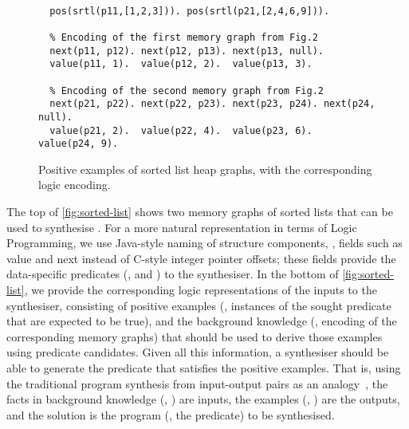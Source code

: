 \begin{figure}[t]
\centering

\\[5pt]
\begin{verbatim}
  pos(srtl(p11,[1,2,3])). pos(srtl(p21,[2,4,6,9])).

  % Encoding of the first memory graph from Fig.2
  next(p11, p12). next(p12, p13). next(p13, null). 
  value(p11, 1).  value(p12, 2).  value(p13, 3).

  % Encoding of the second memory graph from Fig.2
  next(p21, p22). next(p22, p23). next(p23, p24). next(p24, null).
  value(p21, 2).  value(p22, 4).  value(p23, 6).  value(p24, 9).
\end{verbatim}

    \caption{Positive examples of sorted list heap graphs, with the corresponding logic encoding.}
    \label{fig:sorted-list}
\end{figure}

The top of \autoref{fig:sorted-list} shows two memory graphs of sorted
lists that can be used to synthesise .
%
For a more natural representation in terms of Logic Programming, we
use Java-style naming of structure components, \ie, fields such as
{\small{\textsf{value}}} and {\small{\textsf{next}}} instead of
C-style integer pointer offsets;
%
these fields provide the data-specific predicates (\ie, 
and ) to the synthesiser. In the bottom of
\autoref{fig:sorted-list}, we provide the corresponding logic
representations of the inputs to the synthesiser, consisting of
positive examples (\ie, instances of the sought predicate that are
expected to be true), and the background knowledge (\ie, encoding of
the corresponding memory graphs) that should be used to derive those
examples using predicate candidates.
%
Given all this information, a synthesiser should be able to generate
the predicate  that satisfies the positive examples.
%
That is, using the traditional program synthesis from
input-output pairs as an analogy~\cite{GulwaniPS17}, the facts in
background knowledge (\eg, ) are inputs, the
examples (\eg, ) are the outputs, and
the solution is the program (\ie, the predicate) to be synthesised.


